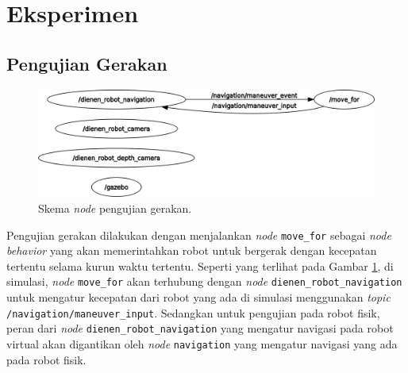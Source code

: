 \section{Eksperimen}
\label{sec:eksperimen}

\subsection{Pengujian Gerakan}

\begin{figure} [ht]
  \centering
  \includegraphics[scale=0.25]{gambar/nodeujigerak.png}
  \caption{Skema \emph{node} pengujian gerakan.}
  \label{fig:nodeujigerak}
\end{figure}

Pengujian gerakan dilakukan dengan menjalankan \emph{node} \lstinline{move_for} sebagai \emph{node behavior} yang akan memerintahkan robot untuk bergerak dengan kecepatan tertentu selama kurun waktu tertentu.
Seperti yang terlihat pada Gambar \ref{fig:nodeujigerak}, di simulasi, \emph{node} \lstinline{move_for} akan terhubung dengan \emph{node} \lstinline{dienen_robot_navigation} untuk mengatur kecepatan dari robot yang ada di simulasi menggunakan \emph{topic} \lstinline{/navigation/maneuver_input}.
Sedangkan untuk pengujian pada robot fisik, peran dari \emph{node} \lstinline{dienen_robot_navigation} yang mengatur navigasi pada robot virtual akan digantikan oleh \emph{node} \lstinline{navigation} yang mengatur navigasi yang ada pada robot fisik.


